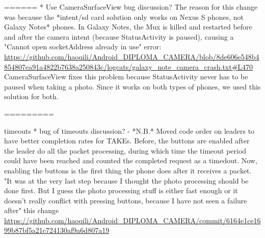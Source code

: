 ======
* Use CameraSurfaceView bug discussion?
   The reason for this change was because the *intent/sd card solution only works on Nexus S phones, not Galaxy Notes* phones. In Galaxy Notes, the Mux is killed and restarted before and after the camera intent (because StatusActivity is paused), causing a "Cannot open socketAddress already in use" error: {\url{https://github.com/haoqili/Android_DIPLOMA_CAMERA/blob/8de606e548b4854807ea91a4822b7638a250843c/logcats/galaxy_note_camera_crash.txt#L470}}
    CameraSurfaceView fixes this problem because StatusActivity never has to be paused when taking a photo. Since it works on both types of phones, we used this solution for both.

=========

timeouts
* bug of timeouts discussion?
    - *N.B.* Moved code order on leaders to have better completion rates for TAKEs. Before, the buttons are enabled after the leader do all the packet processing, during which time the timeout period could have been reached and counted the completed request as a timedout. Now, enabling the buttons is the first thing the phone does after it receives a packet.
        "It was at the very last step because I thought the photo processing should be done first. But I guess the photo processing stuff is either fast enough or it doesn't really conflict with pressing buttons, because I have not seen a failure after" this change
        {\url{https://github.com/haoqili/Android_DIPLOMA_CAMERA/commit/6164e1ce1699b87bf5a21c724130af9a6d807a19}}

